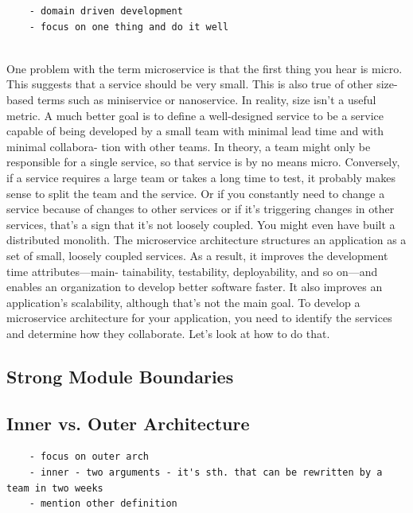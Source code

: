 \documentclass[thesis=M,english,hidelinks]{FITthesis}[2012/10/20]
\begin{document}
\begin{verbatim}
    - domain driven development
    - focus on one thing and do it well
        
\end{verbatim}
    One problem with the term microservice is that the first thing you hear is micro. This suggests that a service should be very small. This is also true of other size-based terms such as miniservice or nanoservice. In reality, size isn’t a useful metric.
A much better goal is to define a well-designed service to be a service capable of being developed by a small team with minimal lead time and with minimal collabora- tion with other teams. In theory, a team might only be responsible for a single service, so that service is by no means micro. Conversely, if a service requires a large team or takes a long time to test, it probably makes sense to split the team and the service. Or if you constantly need to change a service because of changes to other services or if it’s triggering changes in other services, that’s a sign that it’s not loosely coupled. You might even have built a distributed monolith.
The microservice architecture structures an application as a set of small, loosely coupled services. As a result, it improves the development time attributes—main- tainability, testability, deployability, and so on—and enables an organization to develop better software faster. It also improves an application’s scalability, although that’s not the main goal. To develop a microservice architecture for your application, you need to identify the services and determine how they collaborate. Let’s look at how to do that.

\subsection{Strong Module Boundaries}

\subsection{Inner vs. Outer Architecture}
\begin{verbatim}
    - focus on outer arch
    - inner - two arguments - it's sth. that can be rewritten by a team in two weeks
    - mention other definition
\end{verbatim}
\end{document}
